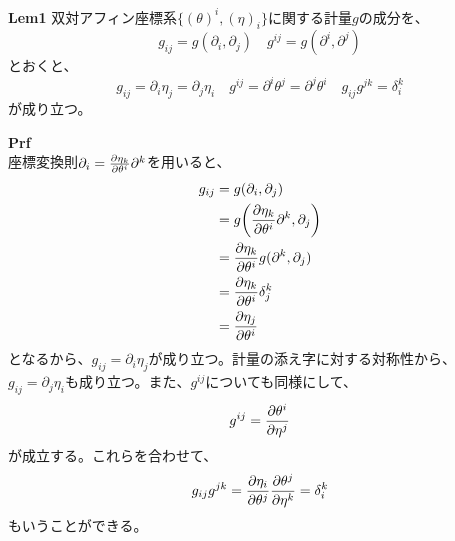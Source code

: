 \documentclass[a4paper,11pt]{jsarticle}
\numberwithin{equation}{section}
\begin{document}
    \begin{itembox}[l]{\textbf{Lem1}}
        双対アフィン座標系$\{(\theta)^i,(\eta)_i\}$に関する計量$g$の成分を、
        \begin{equation}
            g_{ij} = g(\partial_i,\partial_j) \quad g^{ij} = g(\partial^i,\partial^j)
        \end{equation}
        とおくと、
        \begin{equation}
            g_{ij} = \partial_i \eta_j = \partial_j \eta_i \quad g^{ij} = \partial^i \theta^j = \partial^j \theta^i \quad g_{ij}g^{jk} = \delta_i^k
        \end{equation}
        が成り立つ。
    \end{itembox}
    \textbf{Prf}\\
    座標変換則$\partial_i = \pdv{\eta_k}{\theta^i}\partial^k$を用いると、
    \begin{align}
        g_{ij} &= g(\partial_i,\partial_j) \\
        &= g\qty(\pdv{\eta_k}{\theta^i}\partial^k,\partial_j) \\
        &= \pdv{\eta_k}{\theta^i}g(\partial^k,\partial_j) \\
        &= \pdv{\eta_k}{\theta^i}\delta_j^k \\
        &= \pdv{\eta_j}{\theta^i}
    \end{align}
    となるから、$g_{ij} = \partial_i \eta_j$が成り立つ。計量の添え字に対する対称性から、$g_{ij} = \partial_j \eta_i$も成り立つ。また、$g^{ij}$についても同様にして、
    \begin{align}
        g^{ij} = \pdv{\theta ^i}{\eta^j}
    \end{align}
    が成立する。これらを合わせて、
    \begin{align}
        g_{ij}g^{jk} = \pdv{\eta_i}{\theta^j}\pdv{\theta^j}{\eta^k} = \delta_i^k
    \end{align}
    もいうことができる。\hfill\qedsymbol
    
\end{document}
